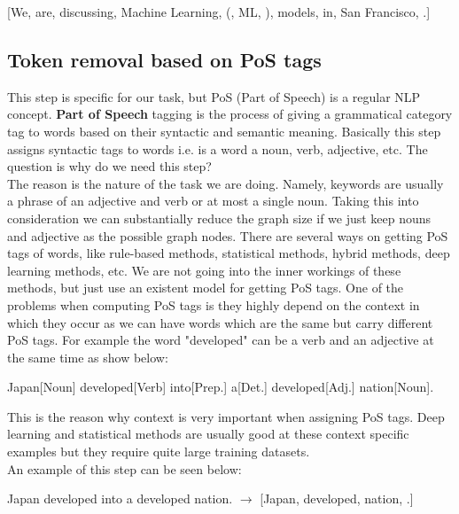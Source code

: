 \documentclass[12pt]{article}
\numberwithin{equation}{section}
\begin{document}
\begin{spacing}{1.5}
\begin{center}
		[We, are, discussing, Machine Learning, (, ML, ), models, in, San Francisco, .]
	\end{center} 
	
	\subsection{Token removal based on PoS tags}
	This step is specific for our task, but PoS (Part of Speech) is a regular NLP concept. \textbf{Part of Speech} tagging is the process of giving a grammatical category tag to words based on their syntactic and semantic meaning. Basically this step assigns syntactic tags to words i.e. is a word a noun, verb, adjective, etc. The question is why do we need this step?\\
	The reason is the nature of the task we are doing. Namely, keywords are usually a phrase of an adjective and verb or at most a single noun. Taking this into consideration we can substantially reduce the graph size if we just keep nouns and adjective as the possible graph nodes. There are several ways on getting PoS tags of words, like rule-based methods, statistical methods, hybrid methods, deep learning methods, etc. 
	We are not going into the inner workings of these methods, but just use an existent model for getting PoS tags. One of the problems when computing PoS tags is they highly depend on the context in which they occur as we can have words which are the same but carry different PoS tags. For example the word "developed" can be a verb and an adjective at the same time as show below:
	\begin{center}
		Japan[Noun] developed[Verb] into[Prep.] a[Det.] developed[Adj.] nation[Noun].
	\end{center}
	This is the reason why context is very important when assigning PoS tags. Deep learning and statistical methods are usually good at these context specific examples but they require quite large training datasets. \\
	An example of this step can be seen below:
	\begin{center}
		Japan developed into a developed nation. $\rightarrow$ [Japan, developed, nation, .]
	\end{center}	  
	

\end{spacing}
\end{document}

